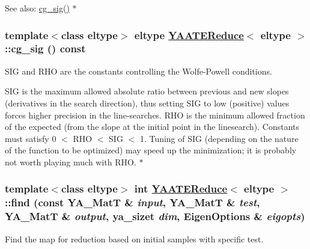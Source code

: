 \begin{Desc}
\item[See also:]\hyperlink{class_y_a_a_t_e_reduce_a38}{cg\_\-sig()} $\ast$ \end{Desc}
\hypertarget{class_y_a_a_t_e_reduce_a38}{
\subsubsection[cg\_\-sig]{\setlength{\rightskip}{0pt plus 5cm}template$<$class eltype$>$ eltype \hyperlink{class_y_a_a_t_e_reduce}{YAATEReduce}$<$ eltype $>$::cg\_\-sig () const}}
\label{class_y_a_a_t_e_reduce_a38}


SIG and RHO are the constants controlling the Wolfe-Powell conditions. 

SIG is the maximum allowed absolute ratio between previous and new slopes (derivatives in the search direction), thus setting SIG to low (positive) values forces higher precision in the line-searches. RHO is the minimum allowed fraction of the expected (from the slope at the initial point in the linesearch). Constants must satisfy 0 $<$ RHO $<$ SIG $<$ 1. Tuning of SIG (depending on the nature of the function to be optimized) may speed up the minimization; it is probably not worth playing much with RHO. $\ast$ \hypertarget{class_y_a_a_t_e_reduce_a6}{
\subsubsection[find]{\setlength{\rightskip}{0pt plus 5cm}template$<$class eltype$>$ int \hyperlink{class_y_a_a_t_e_reduce}{YAATEReduce}$<$ eltype $>$::find (const YA\_\-Mat\-T \& {\em input}, YA\_\-Mat\-T \& {\em test}, YA\_\-Mat\-T \& {\em output}, ya\_\-sizet {\em dim}, Eigen\-Options \& {\em eigopts})}}
\label{class_y_a_a_t_e_reduce_a6}


Find the map for reduction based on initial samples with specific test. 


